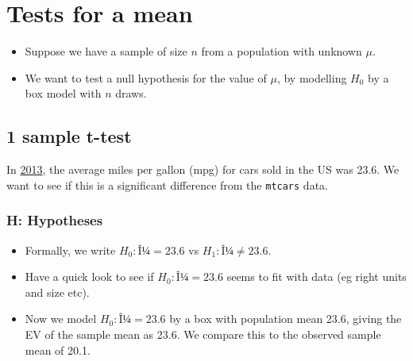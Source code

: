 \documentclass[]{article}
\newenvironment{Shaded}{\begin{snugshade}}{\end{snugshade}}
\newcommand{\CommentTok}[1]{\textcolor[rgb]{0.56,0.35,0.01}{\textit{#1}}}
\newcommand{\KeywordTok}[1]{\textcolor[rgb]{0.13,0.29,0.53}{\textbf{#1}}}
\newcommand{\NormalTok}[1]{#1}
\newcommand{\OperatorTok}[1]{\textcolor[rgb]{0.81,0.36,0.00}{\textbf{#1}}}
\providecommand{\tightlist}{%
  \setlength{\itemsep}{0pt}\setlength{\parskip}{0pt}}
\begin{document}
\hypertarget{testformean}{%
\section{Tests for a mean}\label{testformean}}

\begin{itemize}
\item
  Suppose we have a sample of size \(n\) from a population with unknown \(\mu\).
\item
  We want to test a null hypothesis for the value of \(\mu\), by modelling \(H_{0}\) by a box model with \(n\) draws.
\end{itemize}

\hypertarget{sample-t-test}{%
\subsection{1 sample t-test}\label{sample-t-test}}

In \href{https://www.washingtonpost.com/news/wonk/wp/2013/12/13/cars-in-the-u-s-are-more-fuel-efficient-than-ever-heres-how-it-happened/?utm_term=.fa2ecb3afa4d}{2013}, the average miles per gallon (mpg) for cars sold in the US was 23.6. We want to see if this is a significant difference from the \texttt{mtcars} data.

\hypertarget{h-hypotheses}{%
\subsubsection{H: Hypotheses}\label{h-hypotheses}}

\begin{itemize}
\item
  Formally, we write \(H_0: Î¼=23.6\) vs \(H_1: Î¼ \neq 23.6\).
\item
  Have a quick look to see if \(H_0: Î¼=23.6\) seems to fit with data (eg right units and size etc).
\end{itemize}

\begin{Shaded}
\end{Shaded}

\begin{itemize}
\tightlist
\item
  Now we model \(H_0: Î¼=23.6\) by a box with population mean 23.6, giving the EV of the sample mean as 23.6. We compare this to the observed sample mean of 20.1.
\end{itemize}
\end{document}
